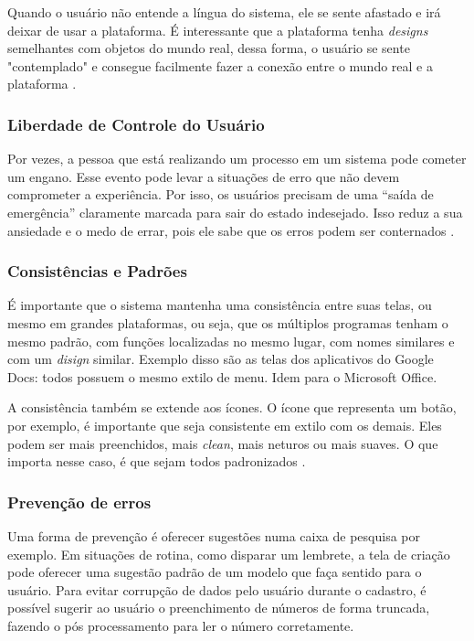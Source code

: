 Quando o usuário não entende a língua do sistema, ele se sente afastado e irá deixar de usar a plataforma. É interessante que a plataforma tenha \textit{designs} semelhantes com objetos do mundo real, dessa forma, o usuário se sente "contemplado" e consegue facilmente fazer a conexão entre o mundo real e a plataforma \cite{site:nielsenRealWorld}.

\subsubsection{Liberdade de Controle do Usuário}

Por vezes, a pessoa que está realizando um processo em um sistema pode cometer um engano. Esse evento pode levar a situações de erro que não devem comprometer a experiência. Por isso, os usuários precisam de uma “saída de emergência” claramente marcada para sair do estado indesejado. Isso reduz a sua ansiedade e o medo de errar, pois ele sabe que os erros podem ser conternados \cite{BarbosaEtAl2021InteracaoHumanoComputadorExperiencia}.

\subsubsection{Consistências e Padrões}

É importante que o sistema mantenha uma consistência entre suas telas, ou mesmo em grandes plataformas, ou seja, que os múltiplos programas tenham o mesmo padrão, com funções localizadas no mesmo lugar, com nomes similares e com um \textit{disign} similar. Exemplo disso são as telas dos aplicativos do Google Docs: todos possuem o mesmo extilo de menu. Idem para o Microsoft Office.

A consistência também se extende aos ícones. O ícone que representa um botão, por exemplo, é importante que seja consistente em extilo com os demais. Eles podem ser mais preenchidos, mais \textit{clean}, mais neturos ou mais suaves. O que importa nesse caso, é que sejam todos padronizados \cite{site:nielsenIcon}.


\subsubsection{Prevenção de erros}

Uma forma de prevenção é oferecer sugestões numa caixa de pesquisa por exemplo. Em situações de rotina, como disparar um lembrete, a tela de criação pode oferecer uma sugestão padrão de um modelo que faça sentido para o usuário. Para evitar corrupção de dados pelo usuário durante o cadastro, é possível sugerir ao usuário o preenchimento de números de forma truncada, fazendo o pós processamento para ler o número corretamente.

